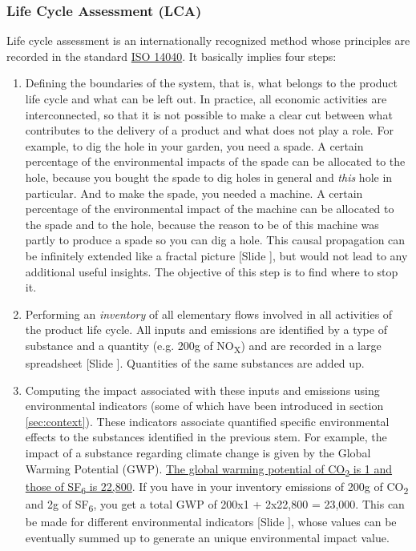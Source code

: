 \documentclass{article}
\newcounter{slide}
\begin{document}
\subsubsection{Life Cycle Assessment (LCA)}
\label{sec:lca}
Life cycle assessment is an internationally recognized method whose principles are recorded in the standard \href{https://www.iso.org/en/standard/37456.html}{ISO 14040}. It basically implies four steps:
\begin{enumerate}
	\item Defining the boundaries of the system, that is, what belongs to the product life cycle and what can be left out. In practice, all economic activities are interconnected, so that it is not possible to make a clear cut between what contributes to the delivery of a product and what does not play a role. For example, to dig the hole in your garden, you need a spade. A certain percentage of the environmental impacts of the spade can be allocated to the hole, because you bought the spade to dig holes in general and \emph{this} hole in particular. And to make the spade, you needed a machine. A certain percentage of the environmental impact of the machine can be allocated to the spade and to the hole, because the reason to be of this machine was partly to produce a spade so you can dig a hole. This causal propagation can be infinitely extended like a fractal picture {\color{blue}[Slide ]}, but would not lead to any additional useful insights. The objective of this step is to find where to stop it.
	\item Performing an \emph{inventory} of all elementary flows involved in all activities of the product life cycle. All inputs and emissions are identified by a type of substance and a quantity (e.g. 200g of NO\textsubscript{X}) and are recorded in a large spreadsheet {\color{blue}[Slide ]}. Quantities of the same substances are added up. 
	\item Computing the impact associated with these inputs and emissions using environmental indicators (some of which have been introduced in section \ref{sec:context}). These indicators associate quantified specific environmental effects to the substances identified in the previous stem. For example, the impact of a substance regarding climate change is given by the Global Warming Potential (GWP). \href{http://www.ghgprotocol.org/sites/default/files/ghgp/Global-Warming-Potential-Values\%20\%28Feb\%2016\%202016\%29_1.pdf}{The global warming potential of CO\textsubscript{2} is 1 and those of SF\textsubscript{6} is 22,800}. If you have in your inventory emissions of 200g of CO\textsubscript{2} and 2g of SF\textsubscript{6}, you get a total GWP of 200x1 + 2x22,800 = 23,000. This can be made for different environmental indicators {\color{blue}[Slide ]}, whose values can be eventually summed up to generate an unique environmental impact value.

\end{enumerate}
\end{document}
